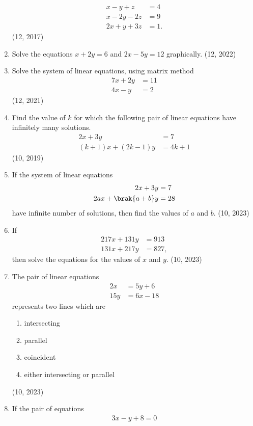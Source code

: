 \begin{enumerate}[label=\thesubsection.\arabic*,ref=\thesubsection.\theenumi]
\begin{align*}
	x-y+z&=4\\
	x-2y-2z&=9
	\\
	2x+y+3z&=1 .
\end{align*}
\hfill (12, 2017)
\item Solve the equations $x+2y=6$ and $2x-5y=12$ graphically. \hfill (12, 2022)
\item Solve the system of linear equations, using matrix method  
\begin{align*}
  7x + 2y &= 11\\
  4x - y &= 2
\end{align*}
\hfill (12, 2021)
\item Find the value of $k$ for which the following pair of linear equations have infinitely many solutions. 
\begin{align*}
	2x+3y&=7
	\\
	(k+1)x+(2k-1)y&=4k+1
\end{align*}
\hfill (10, 2019)
\item If the system of linear equations   		
\begin{align*}
		2x + 3y &= 7 \\ 
		2ax + \brak{a+b}y &= 28
\end{align*}
have infinite number of solutions, then find the values of $a$ and $ b $.
\hfill	(10, 2023)
%
\item If
\begin{align*}
	 217x + 131y &= 913 \\
         131x + 217y &= 827,
\end{align*}
 then solve the equations for the values of $x$ and $y$.
\hfill	(10, 2023)
	 \item The pair of linear equations 
\begin{align*}
		 2x &= 5y + 6
		 \\
		15y &= 6x - 18
\end{align*}
represents two lines which are
    \begin{enumerate}
        \item intersecting
        \item parallel
        \item coincident
        \item either intersecting or parallel
    \end{enumerate}
\hfill	(10, 2023)
\item If the pair of equations 
\begin{align*}
	3x - y + 8 = 0
	\\

\end{align*}
\end{enumerate}
